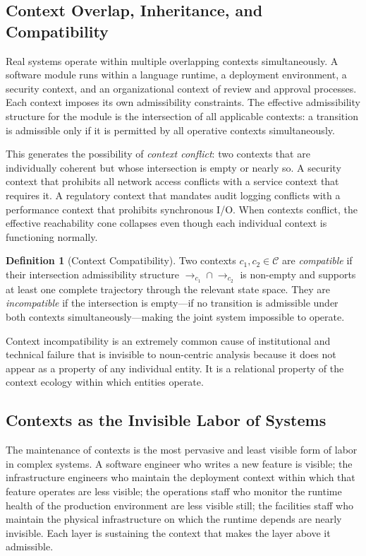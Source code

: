 \documentclass[12pt, a4paper]{article}
\theoremstyle{plain}
\theoremstyle{definition}
\newtheorem{definition}[theorem]{Definition}
\theoremstyle{remark}
\begin{document}
\subsection{Context Overlap, Inheritance, and Compatibility}

Real systems operate within multiple overlapping contexts simultaneously.
A software module runs within a language runtime, a deployment environment,
a security context, and an organizational context of review and approval
processes. Each context imposes its own admissibility constraints. The
effective admissibility structure for the module is the intersection of all
applicable contexts: a transition is admissible only if it is permitted by
all operative contexts simultaneously.

This generates the possibility of \emph{context conflict}: two contexts that
are individually coherent but whose intersection is empty or nearly so. A
security context that prohibits all network access conflicts with a service
context that requires it. A regulatory context that mandates audit logging
conflicts with a performance context that prohibits synchronous I/O. When
contexts conflict, the effective reachability cone collapses even though each
individual context is functioning normally.

\begin{definition}[Context Compatibility]
Two contexts $c_1, c_2 \in \mathcal{C}$ are \emph{compatible} if their
intersection admissibility structure $\to_{c_1} \cap \to_{c_2}$ is non-empty
and supports at least one complete trajectory through the relevant state space.
They are \emph{incompatible} if the intersection is empty---if no transition
is admissible under both contexts simultaneously---making the joint system
impossible to operate.
\end{definition}

Context incompatibility is an extremely common cause of institutional and
technical failure that is invisible to noun-centric analysis because it does
not appear as a property of any individual entity. It is a relational property
of the context ecology within which entities operate.

\subsection{Contexts as the Invisible Labor of Systems}

The maintenance of contexts is the most pervasive and least visible form of
labor in complex systems. A software engineer who writes a new feature is
visible; the infrastructure engineers who maintain the deployment context
within which that feature operates are less visible; the operations staff
who monitor the runtime health of the production environment are less visible
still; the facilities staff who maintain the physical infrastructure on which
the runtime depends are nearly invisible. Each layer is sustaining the context
that makes the layer above it admissible.
\end{document}
